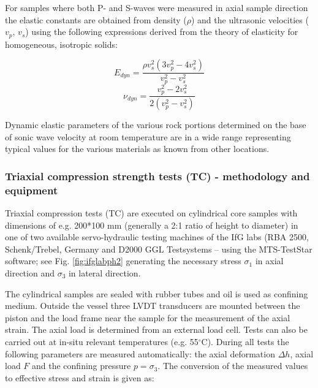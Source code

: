 For samples where both P- and S-waves were measured in axial sample direction the elastic constants are obtained from density ($\rho$) and the ultrasonic velocities ($v_p$, $v_s$) using the following expressions derived from the theory of elasticity for homogeneous, isotropic solids:

\begin{equation}
\label{eq:YoungsModulus_Ultrasonic}
E_{dyn} = \frac{\rho v_s^2(3v_p^2-4v_s^2)}{v_p^2-v_s^2} 
\end{equation}
\begin{equation}
\label{eq:PoissonsRatio_Ultrasonic}
\nu_{dyn} = \frac{v_p^2-2v_s^2}{2(v_p^2-v_s^2)}
\end{equation}

Dynamic elastic parameters of the various rock portions determined on the base of sonic wave velocity at room temperature are in a wide range representing typical values for the various materials as known from other locations. 

\subsubsection{Triaxial compression strength tests (TC) - methodology and equipment}

Triaxial compression tests (TC) are executed on cylindrical core samples with dimensions of e.g. 200*100 mm (generally a 2:1 ratio of height to diameter) in one of two available servo-hydraulic testing machines of the IfG labs (RBA 2500, Schenk/Trebel, Germany and D2000 GGL Testsystems – using the MTS-TestStar software; see Fig. \ref{fig:ifglabph2} generating the necessary stress $\sigma_1$ in axial direction and $\sigma_3$ in lateral direction.

The cylindrical samples are sealed with rubber tubes and oil is used as confining medium. Outside the vessel three LVDT transducers are mounted between the piston and the load frame near the sample for the measurement of the axial strain. The axial load is determined from an external load cell. Tests can also be carried out at in-situ relevant temperatures (e.g. 55$^\circ$C). During all tests the following parameters are measured automatically: the axial deformation $\Delta h$, axial load $F$ and the confining pressure $p = \sigma_3$. The conversion of the measured values to effective stress and strain is given as:

